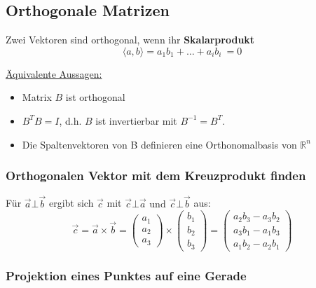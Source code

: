 \subsection{Orthogonale Matrizen}

Zwei Vektoren sind orthogonal, wenn ihr \textbf{Skalarprodukt}\\ 
\begin{equation*}
    \langle a, b \rangle = a_1 b_1 + \hdots + a_i b_i\ = 0
\end{equation*}

\underline{Äquivalente Aussagen:}
\begin{itemize}
    \item Matrix \(B\) ist orthogonal
    \item \(B^T B = I\), d.h. \(B\) ist invertierbar mit \(B^{-1}=B^T\).
    \item Die Spaltenvektoren von B definieren eine Orthonomalbasis von \(\mathbb{R}^n\)\\
\end{itemize}

\subsubsection{Orthogonalen Vektor mit dem Kreuzprodukt finden}
Für \(\vec{a} \bot \vec{b}\) ergibt sich \(\vec{c}\) mit \(\vec{c} \bot \vec{a}\text{ und }\vec{c} \bot \vec{b}\) aus:
\begin{equation*}
    \vec{c} = 
    \vec{a} \times \vec{b} = \begin{pmatrix}
        a_1 \\
        a_2 \\
        a_3
    \end{pmatrix} \times
    \begin{pmatrix}
        b_1 \\
        b_2 \\
        b_3
    \end{pmatrix} =
    \begin{pmatrix}
        a_2 b_3 - a_3 b_2 \\
        a_3 b_1 - a_1 b_3 \\
        a_1 b_2 - a_2 b_1
    \end{pmatrix}
\end{equation*}

\subsubsection{Projektion eines Punktes auf eine Gerade}

